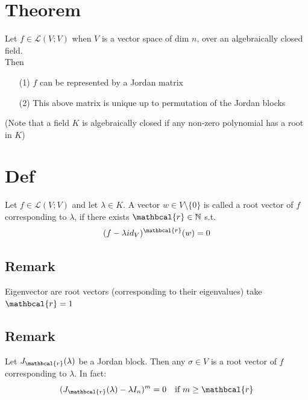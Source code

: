 \documentclass{book}
\begin{document}
\section{Theorem}Let $f\in\mathscr{L}(V;V)$ when $V$ is a vector space of dim $n$, over an algebraically closed field.\\Then
\begin{itemize}
    \item [(1)]$f$ can be represented by a Jordan matrix
    \item [(2)]This above matrix is unique up to permutation of the Jordan blocks
\end{itemize}


(Note that a field $K$ is algebraically closed if any non-zero polynomial has a root in $K$)
\section{Def}
Let $f\in\mathscr{L}(V;V)$ and let $\lambda\in K$. A vector $w\in V\setminus\{0\}$ is called a root vector of $f$ corresponding to $\lambda$, if there exists $\mathbcal{r}\in\mathbb{N}$ s.t. $$(f-\lambda id_V)^\mathbcal{r}(w)=0$$
\subsection*{Remark}
Eigenvector are root vectors (corresponding to their eigenvalues) take $\mathbcal{r}=1$

\subsection*{Remark}
Let $J_\mathbcal{r}(\lambda)$ be a Jordan block. Then any $\sigma\in V$ is a root vector of $f$ corresponding to $\lambda$. In fact:
$$(J_\mathbcal{r}(\lambda)-\lambda I_n)^m=0\quad\text{if }m\geq\mathbcal{r}$$
\end{document}
